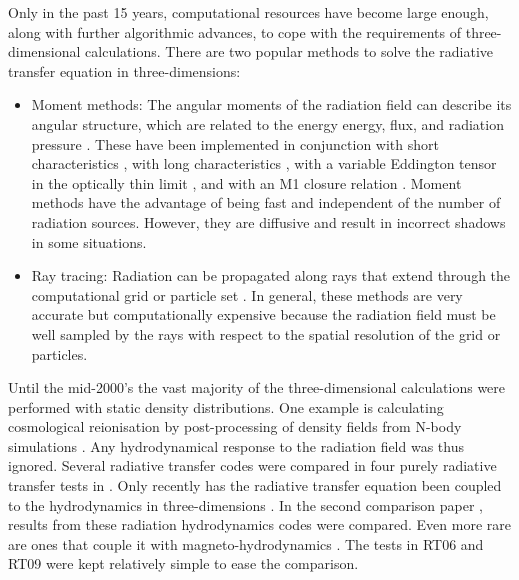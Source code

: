 \documentclass[useAMS,usenatbib]{mn2e}
\begin{document}
Only in the past 15 years, computational resources have become large
enough, along with further algorithmic advances, to cope with the
requirements of three-dimensional calculations.  There are two popular
methods to solve the radiative transfer equation in three-dimensions:
%
\begin{itemize}
\item Moment methods: The angular moments of the radiation field can
  describe its angular structure, which are related to the energy
  energy, flux, and radiation pressure \citep{Auer70, Norman98}.
  These have been implemented in conjunction with short
  characteristics \citep[2D]{Stone92_RHD}, with long characteristics
  \citep{Finlator09}, with a variable Eddington tensor in the
  optically thin limit \citep[OTVET;][]{Gnedin01_OTVET, Petkova09},
  and with an M1 closure relation \citep{Gonzalez07, Aubert08}.
  Moment methods have the advantage of being fast and independent of
  the number of radiation sources.  However, they are diffusive and
  result in incorrect shadows in some situations.
\item Ray tracing:  Radiation can be propagated along rays that extend
  through the computational grid \citep[e.g.][]{Razoumov99, Abel99_RT,
    Ciardi01, Sokasian01, Whalen06, Rijkhorst06, Mellema06, Alvarez06,
    Trac07, Krumholz07_ART, Paardekooper10} or particle set
  \citep[e.g.][]{Susa06, Johnson07, Pawlik08, Pawlik10, Altay08,
    Hasegawa09}.  In general, these methods are very accurate but
  computationally expensive because the radiation field must be well
  sampled by the rays with respect to the spatial resolution of the
  grid or particles.
\end{itemize}
%
Until the mid-2000's the vast majority of the three-dimensional
calculations were performed with static density distributions.  One
example is calculating cosmological reionisation by post-processing of
density fields from N-body simulations \citep{Ciardi01, Sokasian01,
  McQuinn07, Iliev06, Iliev07}.  Any hydrodynamical response to the
radiation field was thus ignored.  Several radiative transfer codes
were compared in four purely radiative transfer tests in
\citet[hereafter RT06]{RT06}.  Only recently has the radiative
transfer equation been coupled to the hydrodynamics in
three-dimensions \citep[e.g.][]{Krumholz07_FLD}.  In the second
comparison paper \citep[hereafter RT09]{Iliev09}, results from these
radiation hydrodynamics codes were compared.  Even more rare are ones
that couple it with magneto-hydrodynamics
\citep[e.g.][]{Krumholz07_ART}.  The tests in RT06 and RT09 were kept
relatively simple to ease the comparison.
\end{document}
